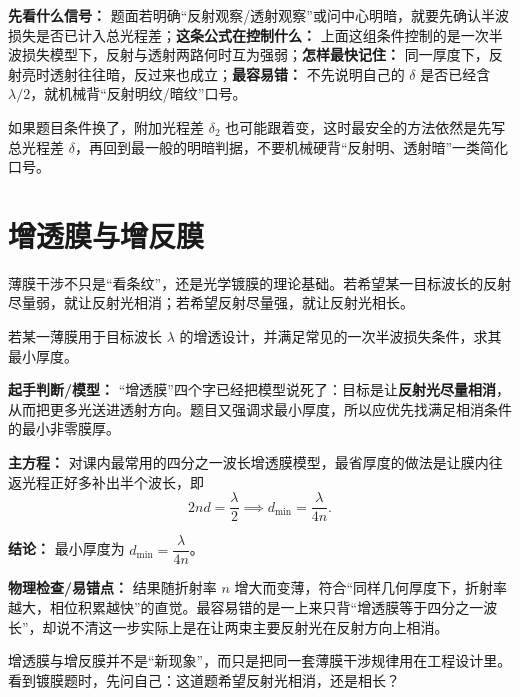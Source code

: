 \documentclass[lang=cn,11pt]{elegantbook}
\begin{document}
\begin{note}
\textbf{先看什么信号：} 题面若明确“反射观察/透射观察”或问中心明暗，就要先确认半波损失是否已计入总光程差；\textbf{这条公式在控制什么：} 上面这组条件控制的是一次半波损失模型下，反射与透射两路何时互为强弱；\textbf{怎样最快记住：} 同一厚度下，反射亮时透射往往暗，反过来也成立；\textbf{最容易错：} 不先说明自己的 \(\delta\) 是否已经含 \(\lambda/2\)，就机械背“反射明纹/暗纹”口号。
\end{note}

\begin{remark}
如果题目条件换了，附加光程差 \(\delta_2\) 也可能跟着变，这时最安全的方法依然是先写总光程差 \(\delta\)，再回到最一般的明暗判据，不要机械硬背“反射明、透射暗”一类简化口号。
\end{remark}

\section{增透膜与增反膜}

薄膜干涉不只是“看条纹”，还是光学镀膜的理论基础。若希望某一目标波长的反射尽量弱，就让反射光相消；若希望反射尽量强，就让反射光相长。

\begin{example}[四分之一波长增透膜的最小厚度]
若某一薄膜用于目标波长 \(\lambda\) 的增透设计，并满足常见的一次半波损失条件，求其最小厚度。
\end{example}

\begin{solution}
\textbf{起手判断/模型：} “增透膜”四个字已经把模型说死了：目标是让\textbf{反射光尽量相消}，从而把更多光送进透射方向。题目又强调求最小厚度，所以应优先找满足相消条件的最小非零膜厚。

\textbf{主方程：} 对课内最常用的四分之一波长增透膜模型，最省厚度的做法是让膜内往返光程正好多补出半个波长，即
\[
2nd=\frac{\lambda}{2}\implies d_{\min}=\frac{\lambda}{4n}.
\]

\textbf{结论：} 最小厚度为 \(d_{\min}=\dfrac{\lambda}{4n}\)。

\textbf{物理检查/易错点：} 结果随折射率 \(n\) 增大而变薄，符合“同样几何厚度下，折射率越大，相位积累越快”的直觉。最容易错的是一上来只背“增透膜等于四分之一波长”，却说不清这一步实际上是在让两束主要反射光在反射方向上相消。
\end{solution}

\begin{note}
增透膜与增反膜并不是“新现象”，而只是把同一套薄膜干涉规律用在工程设计里。看到镀膜题时，先问自己：这道题希望反射光相消，还是相长？
\end{note}
\end{document}
